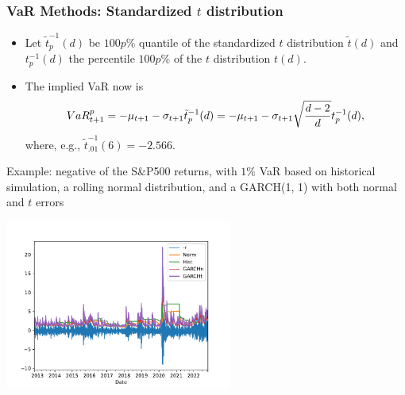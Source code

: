 \begin{frame}%

\frametitle{VaR Methods: Standardized $t$ distribution}

\begin{itemize}
\item Let $\tilde{t}_{p}^{-1}(d)$ be $100p\%$ quantile of the
standardized $t$ distribution $\tilde{t}(d)$ and $t_{p}^{-1}(d)$ the
percentile $100p\%$ of the $t$ distribution $t(d).$

\item The implied VaR now is
\begin{equation*}
VaR_{t+1}^{p}=-\mu_{t+1} -\sigma _{t+1}\tilde{t}_{p}^{-1}(d)=-\mu_{t+1 }-\sigma _{t+1}\sqrt{\frac{%
d-2}{d}}t_{p}^{-1}(d),
\end{equation*}%
where, e.g., $\tilde{t}_{.01}^{-1}(6)=-2.566$.
\end{itemize}


\end{frame}%
\begin{frame}%

\begin{block}{Example: negative of the S\&P500 returns, with $1\%$ VaR
based on historical simulation, a rolling normal distribution, and a GARCH(1, 1) with both normal and $t$ errors}
\centerline{\includegraphics[height=2.2in]{VaRs}}
\end{block}
\end{frame}%
%
%
